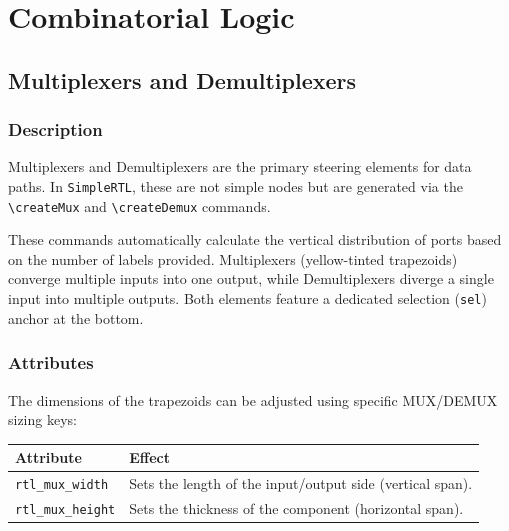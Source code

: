 \chapter{\sffamily Combinatorial Logic}

\section{\sffamily Multiplexers and Demultiplexers}

    \subsection{\sffamily Description}
        Multiplexers and Demultiplexers are the primary steering elements for data paths. In \texttt{SimpleRTL}, these are not simple nodes but are generated via the \texttt{\textbackslash createMux} and \texttt{\textbackslash createDemux} commands. 
        
        These commands automatically calculate the vertical distribution of ports based on the number of labels provided. Multiplexers (yellow-tinted trapezoids) converge multiple inputs into one output, while Demultiplexers diverge a single input into multiple outputs. Both elements feature a dedicated selection (\texttt{sel}) anchor at the bottom.

    \subsection{\sffamily Attributes}
        The dimensions of the trapezoids can be adjusted using specific MUX/DEMUX sizing keys:

    \begin{center}
        \begin{tabular}{lp{8cm}}
        \toprule
            \textbf{Attribute} & \textbf{Effect} \\
            \midrule
            \texttt{rtl\_mux\_width} & Sets the length of the input/output side (vertical span). \\
            \texttt{rtl\_mux\_height} & Sets the thickness of the component (horizontal span). \\
            \bottomrule
        \end{tabular}
    \end{center}

